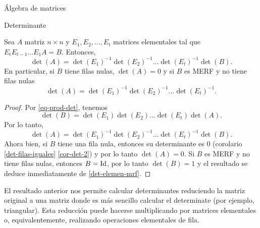 \begin{chapter}{\'Algebra de matrices}
\begin{section}{Determinante}
\begin{observacion*}
    \end{observacion*}
    
    \begin{corolario}\label{cor-det-merf-2}
        Sea $A$ matriz $n \times n$ y $E_1,E_2,\ldots,E_t$ matrices elementales tal que $E_tE_{t-1} \ldots E_1A =B$. Entonces, 
        \begin{equation}\label{det-elemen-mrf}
            \det(A) = \det(E_1)^{-1}\det(E_2)^{-1}\ldots \det(E_t)^{-1}\det(B). 
        \end{equation}
        En particular,  si $B$ tiene filas nulas, $\det(A) =0$ y  si $B$ es MERF y no tiene filas nulas 
        $$
        \det(A) = \det(E_1)^{-1}\det(E_2)^{-1}\ldots \det(E_t)^{-1}.
        $$ 
    \end{corolario}
    \begin{proof}
       Por \eqref{eq-prod-det}, tenemos
        \begin{equation*}
            \det(B) = \det(E_1)\det(E_2)\ldots \det(E_t) \det(A).
        \end{equation*}
        Por lo tanto, 
        \begin{equation*}
            \det(A) = \det(E_1)^{-1}\det(E_2)^{-1}\ldots \det(E_t)^{-1}\det(B).
        \end{equation*}
        Ahora bien, si $B$ tiene una fila nula, entonces su determinante es $0$ (corolario \ref{det-filas-iguales} \ref{cor-det-2}) y por lo tanto $\det(A) =0$. Si $B$ es MERF y no tiene filas nulas, entonces $B = \operatorname{Id}$, por lo tanto $\det(B)= 1$ y el resultado se deduce inmediatamente de \eqref{det-elemen-mrf}.
    \end{proof}

    El resultado anterior nos permite calcular determinantes reduciendo la matriz original a una matriz donde es más sencillo  calcular el determinate (por ejemplo, triangular). Esta reducción puede hacerse multiplicando por matrices elementales o,  equivalentemente,  realizando operaciones elementales de fila. 


\end{section}
\end{chapter}
